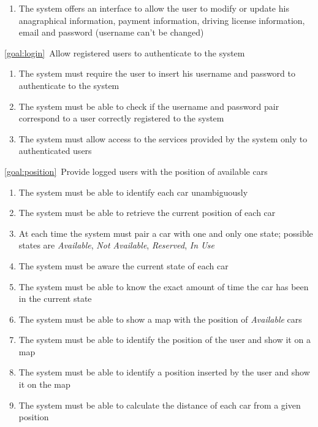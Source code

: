 \begin{description}
\begin{enumerate}[label=\textbf{R\arabic*}]
   				\item The system offers an interface to allow the user to modify or update his
   				anagraphical information, payment information, driving license information, email and
   				password (username can't be changed)
  			\end{enumerate}
		\item \ref{goal:login}\ Allow registered users to authenticate to the system
			\begin{enumerate}[resume*]
  				\item The system must require the user to insert his username and password to
  				authenticate to the system
   				\item The system must be able to check if the username and password pair
   				correspond to a user correctly registered to the system
   				\item The system must allow access to the services provided by the system only to
   				authenticated users 
			\end{enumerate}
		\item \ref{goal:position}\ Provide logged users with the position of available cars
			\begin{enumerate}[resume*]
				\item The system must be able to identify each car unambiguously
  				\item The system must be able to retrieve the current position of each car
  				\item At each time the system must pair a car with one and only one state; possible
  				states are \emph{Available}, \emph{Not Available}, \emph{Reserved}, \emph{In Use}
   				\item The system must be aware the current state of each car
   				\item The system must be able to know the exact amount of time the car has been in
   				the current state
   				\item The system must be able to show a map with the position of \emph{Available}
   				cars
  				\item The system must be able to identify the position of the user and show it on a
  				map
  				\item The system must be able to identify a position inserted by the user and show it on the map
   				\item The system must be able to calculate the distance of each car from a given
   				position
  			\end{enumerate}

\end{description}
